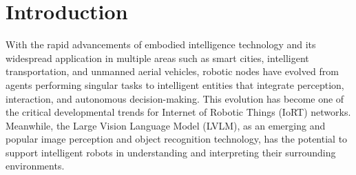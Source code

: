 \documentclass[lettersize,journal]{IEEEtran}
\begin{document}
\section{Introduction}

With the rapid advancements of embodied intelligence technology and its widespread application in multiple areas such as smart cities, intelligent transportation, and unmanned aerial vehicles, robotic nodes have evolved from agents performing singular tasks to intelligent entities that integrate perception, interaction, and autonomous decision-making. This evolution has become one of the critical developmental trends for Internet of Robotic Things (IoRT) networks\cite{andronie2023big}. Meanwhile, the Large Vision Language Model (LVLM)\cite{liu2024survey}, as an emerging and popular image perception and object recognition technology, has the potential to support intelligent robots in understanding and interpreting their surrounding environments. 
\end{document}
